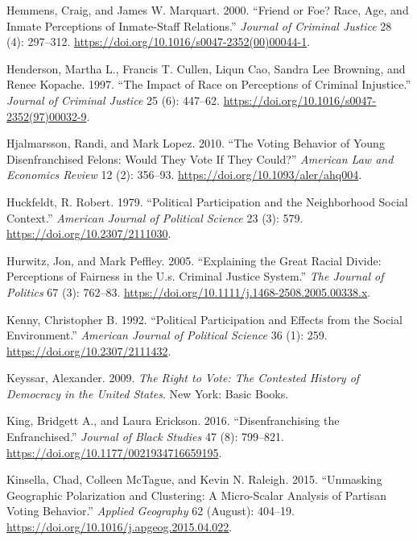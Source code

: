 \documentclass[12pt,]{article}
\begin{document}
\leavevmode\hypertarget{ref-Hemmens2000}{}%
Hemmens, Craig, and James W. Marquart. 2000. ``Friend or Foe? Race, Age, and Inmate Perceptions of Inmate-Staff Relations.'' \emph{Journal of Criminal Justice} 28 (4): 297--312. \url{https://doi.org/10.1016/s0047-2352(00)00044-1}.

\leavevmode\hypertarget{ref-Henderson1997}{}%
Henderson, Martha L., Francis T. Cullen, Liqun Cao, Sandra Lee Browning, and Renee Kopache. 1997. ``The Impact of Race on Perceptions of Criminal Injustice.'' \emph{Journal of Criminal Justice} 25 (6): 447--62. \url{https://doi.org/10.1016/s0047-2352(97)00032-9}.

\leavevmode\hypertarget{ref-Hjalmarsson2010}{}%
Hjalmarsson, Randi, and Mark Lopez. 2010. ``The Voting Behavior of Young Disenfranchised Felons: Would They Vote If They Could?'' \emph{American Law and Economics Review} 12 (2): 356--93. \url{https://doi.org/10.1093/aler/ahq004}.

\leavevmode\hypertarget{ref-Huckfeldt1979}{}%
Huckfeldt, R. Robert. 1979. ``Political Participation and the Neighborhood Social Context.'' \emph{American Journal of Political Science} 23 (3): 579. \url{https://doi.org/10.2307/2111030}.

\leavevmode\hypertarget{ref-Hurwitz2005}{}%
Hurwitz, Jon, and Mark Peffley. 2005. ``Explaining the Great Racial Divide: Perceptions of Fairness in the U.s. Criminal Justice System.'' \emph{The Journal of Politics} 67 (3): 762--83. \url{https://doi.org/10.1111/j.1468-2508.2005.00338.x}.

\leavevmode\hypertarget{ref-Kenny1992}{}%
Kenny, Christopher B. 1992. ``Political Participation and Effects from the Social Environment.'' \emph{American Journal of Political Science} 36 (1): 259. \url{https://doi.org/10.2307/2111432}.

\leavevmode\hypertarget{ref-Keyssar2009}{}%
Keyssar, Alexander. 2009. \emph{The Right to Vote: The Contested History of Democracy in the United States}. New York: Basic Books.

\leavevmode\hypertarget{ref-King2016}{}%
King, Bridgett A., and Laura Erickson. 2016. ``Disenfranchising the Enfranchised.'' \emph{Journal of Black Studies} 47 (8): 799--821. \url{https://doi.org/10.1177/0021934716659195}.

\leavevmode\hypertarget{ref-Kinsella2015}{}%
Kinsella, Chad, Colleen McTague, and Kevin N. Raleigh. 2015. ``Unmasking Geographic Polarization and Clustering: A Micro-Scalar Analysis of Partisan Voting Behavior.'' \emph{Applied Geography} 62 (August): 404--19. \url{https://doi.org/10.1016/j.apgeog.2015.04.022}.
\end{document}
